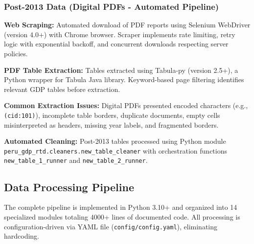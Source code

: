 \documentclass[12pt]{article}
\begin{document}
\subsubsection*{Post-2013 Data (Digital PDFs - Automated Pipeline)}

\textbf{Web Scraping:} Automated download of PDF reports using Selenium WebDriver (version 4.0+) with Chrome browser. Scraper implements rate limiting, retry logic with exponential backoff, and concurrent downloads respecting server policies.

\textbf{PDF Table Extraction:} Tables extracted using Tabula-py (version 2.5+), a Python wrapper for Tabula Java library. Keyword-based page filtering identifies relevant GDP tables before extraction.

\textbf{Common Extraction Issues:} Digital PDFs presented encoded characters (e.g., \texttt{(cid:101)}), incomplete table borders, duplicate documents, empty cells misinterpreted as headers, missing year labels, and fragmented borders.

\textbf{Automated Cleaning:} Post-2013 tables processed using Python module \\
\texttt{peru\_gdp\_rtd.cleaners.new\_table\_cleaner} with orchestration functions \texttt{new\_table\_1\_runner} and \texttt{new\_table\_2\_runner}.

\subsection*{Data Processing Pipeline}

The complete pipeline is implemented in Python 3.10+ and organized into 14 specialized modules totaling 4000+ lines of documented code. All processing is configuration-driven via YAML file (\texttt{config/config.yaml}), eliminating hardcoding.
\end{document}
